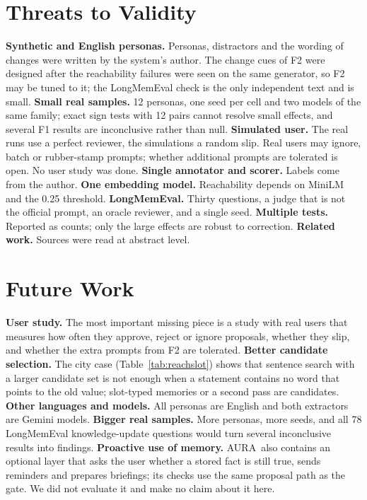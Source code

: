 \IfFileExists{IEEEtran.cls}{\documentclass[journal]{IEEEtran}\def\HAVEIEEE{1}}{\documentclass[10pt,twocolumn]{article}\usepackage[margin=0.7in,columnsep=0.25in]{geometry}}
\newcommand{\aura}{AURA}
\begin{document}
\section{Threats to Validity}
\label{sec:threats}
\textbf{Synthetic and English personas.} Personas, distractors and the wording of changes were written by the system's author. The change cues of F2 were designed after the reachability failures were seen on the same generator, so F2 may be tuned to it; the LongMemEval check is the only independent text and is small. \textbf{Small real samples.} 12 personas, one seed per cell and two models of the same family; exact sign tests with 12 pairs cannot resolve small effects, and several F1 results are inconclusive rather than null. \textbf{Simulated user.} The real runs use a perfect reviewer, the simulations a random slip. Real users may ignore, batch or rubber-stamp prompts; whether additional prompts are tolerated is open. No user study was done. \textbf{Single annotator and scorer.} Labels come from the author. \textbf{One embedding model.} Reachability depends on MiniLM and the 0.25 threshold. \textbf{LongMemEval.} Thirty questions, a judge that is not the official prompt, an oracle reviewer, and a single seed. \textbf{Multiple tests.} Reported as counts; only the large effects are robust to correction. \textbf{Related work.} Sources were read at abstract level.

\section{Future Work}
\label{sec:future}
\textbf{User study.} The most important missing piece is a study with real users that measures how often they approve, reject or ignore proposals, whether they slip, and whether the extra prompts from F2 are tolerated. \textbf{Better candidate selection.} The city case (Table~\ref{tab:reachslot}) shows that sentence search with a larger candidate set is not enough when a statement contains no word that points to the old value; slot-typed memories or a second pass are candidates. \textbf{Other languages and models.} All personas are English and both extractors are Gemini models. \textbf{Bigger real samples.} More personas, more seeds, and all 78 LongMemEval knowledge-update questions would turn several inconclusive results into findings. \textbf{Proactive use of memory.} \aura\ also contains an optional layer that asks the user whether a stored fact is still true, sends reminders and prepares briefings; its checks use the same proposal path as the gate. We did not evaluate it and make no claim about it here.
\end{document}
